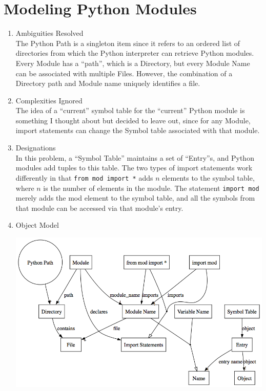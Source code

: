 \documentclass[11pt,letterpaper]{article}
\begin{document}
\section{Modeling Python Modules}
\begin{enumerate}
\item Ambiguities Resolved\\
The Python Path is a singleton item since it refers to an ordered list of directories from which the Python interpreter can retrieve Python modules. Every Module has a ``path'', which is a Directory, but every Module Name can be associated with multiple Files. However, the combination of a Directory path and Module name uniquely identifies a file.
\item Complexities Ignored\\
The idea of a ``current'' symbol table for the ``current'' Python module is something I thought about but decided to leave out, since for any Module, import statements can change the Symbol table associated with that module.
\item Designations\\
In this problem, a ``Symbol Table'' maintains a set of ``Entry''s, and Python modules add tuples to this table. The two types of import statements work differently in that \texttt{from mod import *} adds $n$ elements to the symbol table, where $n$ is the number of elements in the module. The statement \texttt{import mod} merely adds the mod element to the symbol table, and all the symbols from that module can be accessed via that module's entry.
\item Object Model\\
\begin{center}
\includegraphics[width=500pt]{dot/pythonmodules.png}
\label{fig:ob5}
\end{center}
\end{enumerate}
\end{document}
